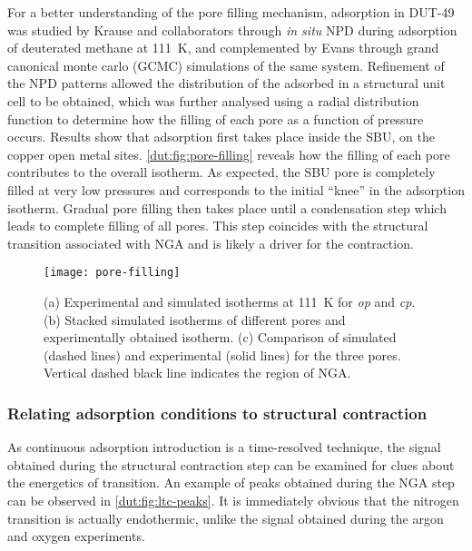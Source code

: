 For a better understanding of the pore filling mechanism, adsorption
in DUT-49 was studied by Krause and collaborators 
through \textit{in situ} \gls{NPD} during adsorption of
deuterated methane  at \SI{111}{\kelvin},
and complemented by Evans through grand canonical monte carlo
(GCMC) simulations of the same system. 
Refinement of the \gls{NPD} patterns allowed the distribution
of the adsorbed  in a structural unit cell to be obtained, which
was further analysed using a radial distribution function to determine
how the filling of each pore as a function of pressure occurs. 
Results show that adsorption first takes place inside the \gls{SBU},
on the copper open metal sites.
\autoref{dut:fig:pore-filling} reveals how
the filling of each pore contributes to the overall isotherm.
As expected, the \gls{SBU} pore is completely filled at very low pressures
and corresponds to the initial ``knee'' in the adsorption isotherm. Gradual
pore filling then takes place until a condensation step which 
leads to complete filling of all pores. This step coincides with 
the structural transition associated with \gls{NGA} and is likely a driver 
for the contraction.

\begin{figure}[htb]
	\centering
	\texttt{[image: pore-filling]}%
    \caption{
        (a) Experimental and simulated  isotherms at 
        \SI{111}{\kelvin} for \textit{op} and \textit{cp}. 
        (b) Stacked simulated isotherms of different pores and 
        experimentally obtained isotherm.
        (c) Comparison of simulated (dashed lines) and experimental
        (solid lines) for the three pores.
        Vertical dashed black line indicates the region of \gls{NGA}.
    }\label{dut:fig:pore-filling}
\end{figure}

\subsubsection{Relating adsorption conditions to structural contraction}

As continuous adsorption introduction is a time-resolved technique, 
the signal obtained during the structural contraction step can 
be examined for clues about the energetics of transition. An example 
of peaks obtained during the \gls{NGA} step can be observed in 
\autoref{dut:fig:ltc-peaks}. It is immediately obvious that 
the nitrogen transition is actually endothermic, unlike the 
signal obtained during the argon and oxygen experiments.

